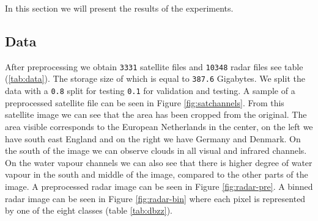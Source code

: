 In this section we will present the results of the experiments.

\subsection{Data}
After preprocessing we obtain \texttt{3331} satellite files and \texttt{10348} radar files see table (\ref{tab:data}).
The storage size of which is equal to \texttt{387.6} Gigabytes.
We split the data with a \texttt{0.8} split for testing \texttt{0.1} for validation and testing.
A sample of a preprocessed satellite file can be seen in Figure \ref{fig:satchannels}.
From this satellite image we can see that the area has been cropped from the original.
The area visible corresponds to the European Netherlands in the center, on the left we have south east England and on the right we have Germany and Denmark.
On the south of the image we can observe clouds in all visual and infrared channels.
On the water vapour channels we can also see that there is higher degree of water vapour in the south and middle of the image, compared to the other parts of the image.
A preprocessed radar image can be seen in Figure \ref{fig:radar-pre}. A binned radar image can be seen in Figure \ref{fig:radar-bin} where each pixel is represented by one of the eight classes (table \ref{tab:dbzz}).

